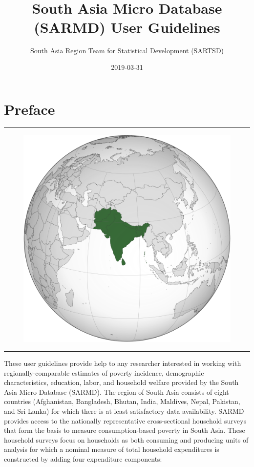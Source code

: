 \documentclass[13 pt,]{book}
\title{South Asia Micro Database (SARMD) User Guidelines}
\author{South Asia Region Team for Statistical Development (SARTSD)}
\date{2019-03-31}
\begin{document}
\maketitle

{
\setcounter{tocdepth}{1}
\tableofcontents
}
\chapter*{Preface}\label{preface}

\begin{center}\rule{0.5\linewidth}{\linethickness}\end{center}

\begin{figure}[htbp]
\centering
\includegraphics{figures/sarmap.png}
\caption{}
\end{figure}

\begin{center}\rule{0.5\linewidth}{\linethickness}\end{center}

These user guidelines provide help to any researcher interested in
working with regionally-comparable estimates of poverty incidence,
demographic characteristics, education, labor, and household welfare
provided by the South Asia Micro Database (SARMD). The region of South
Asia consists of eight countries (Afghanistan, Bangladesh, Bhutan,
India, Maldives, Nepal, Pakistan, and Sri Lanka) for which there is at
least satisfactory data availability. SARMD provides access to the
nationally representative cross-sectional household surveys that form
the basis to measure consumption-based poverty in South Asia. These
household surveys focus on households as both consuming and producing
units of analysis for which a nominal measure of total household
expenditures is constructed by adding four expenditure components:
\end{document}
